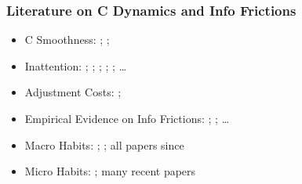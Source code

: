 \documentclass{beamer}\usepackage{dcolumn}
\newcommand{\jemph}[1]{{\color{StataDarkBlue}#1}}
\providecommand{\jemph}[1]{{\color{jirkasblue}#1}}
\begin{document}
\begin{frame}
\frametitle{Literature on C Dynamics and Info Frictions}
\small
\begin{itemize}
\item \jemph{C Smoothness:}
\cite{cdSmooth}; \cite{pischkeMicroMacro};
\cite{rotemberg&woodford:macroannual}

\item \jemph{Inattention:}
\cite{mrSlumps}; \cite{reis:inattentive}; \cite{simsInattention}; \cite{mackWiedREStud15}; \cite{gabaixSparsityQJE}; \dots

\item \jemph{Adjustment Costs:} \cite{alvarezGuisoLippi:DurCons}; \cite{chettySzeidl:cCommitmentsEcta}
\item \jemph{Empirical Evidence on Info Frictions:} \cite{coibGor:AER15}; \cite{fuhrer:IntrinsicPersistence}; \dots

\item \jemph{Macro Habits:}
\cite{abel:aerhabits}; \cite{constantinidesHabits}; all papers since \cite{cee:habits}

\item \jemph{Micro Habits:}
\cite{dynanHabits}; many recent papers

\end{itemize}

\end{frame}
\end{document}
